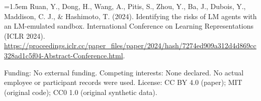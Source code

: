 \documentclass[11pt,letterpaper]{article}
\begin{document}
\par\noindent\hangindent=1.5em Ruan, Y., Dong, H., Wang, A., Pitis, S., Zhou, Y., Ba, J., Dubois, Y., Maddison, C. J., \& Hashimoto, T. (2024). Identifying the risks of LM agents with an LM-emulated sandbox. International Conference on Learning Representations (ICLR 2024). \url{https://proceedings.iclr.cc/paper_files/paper/2024/hash/7274ed909a312d4d869cc328ad1c5f04-Abstract-Conference.html}.
\par\medskip\noindent\small Funding: No external funding. Competing interests: None declared. No actual employee or participant records were used. License: CC BY 4.0 (paper); MIT (original code); CC0 1.0 (original synthetic data).
\end{document}
